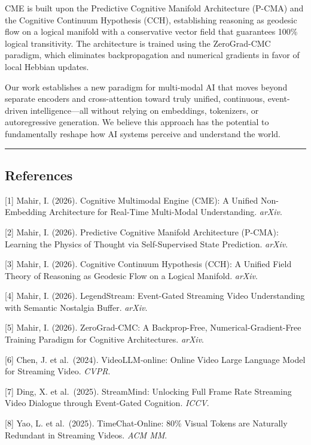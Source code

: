 \documentclass[
  11pt,
  a4paper,
]{article}
\begin{document}
CME is built upon the Predictive Cognitive Manifold Architecture (P-CMA)
and the Cognitive Continuum Hypothesis (CCH), establishing reasoning as
geodesic flow on a logical manifold with a conservative vector field
that guarantees 100\% logical transitivity. The architecture is trained
using the ZeroGrad-CMC paradigm, which eliminates backpropagation and
numerical gradients in favor of local Hebbian updates.

Our work establishes a new paradigm for multi-modal AI that moves beyond
separate encoders and cross-attention toward truly unified, continuous,
event-driven intelligence---all without relying on embeddings,
tokenizers, or autoregressive generation. We believe this approach has
the potential to fundamentally reshape how AI systems perceive and
understand the world.

\begin{center}\rule{0.5\linewidth}{0.5pt}\end{center}

\subsection{References}\label{references}

{[}1{]} Mahir, I. (2026). Cognitive Multimodal Engine (CME): A Unified
Non-Embedding Architecture for Real-Time Multi-Modal Understanding.
\emph{arXiv}.

{[}2{]} Mahir, I. (2026). Predictive Cognitive Manifold Architecture
(P-CMA): Learning the Physics of Thought via Self-Supervised State
Prediction. \emph{arXiv}.

{[}3{]} Mahir, I. (2026). Cognitive Continuum Hypothesis (CCH): A
Unified Field Theory of Reasoning as Geodesic Flow on a Logical
Manifold. \emph{arXiv}.

{[}4{]} Mahir, I. (2026). LegendStream: Event-Gated Streaming Video
Understanding with Semantic Nostalgia Buffer. \emph{arXiv}.

{[}5{]} Mahir, I. (2026). ZeroGrad-CMC: A Backprop-Free,
Numerical-Gradient-Free Training Paradigm for Cognitive Architectures.
\emph{arXiv}.

{[}6{]} Chen, J. et al.~(2024). VideoLLM-online: Online Video Large
Language Model for Streaming Video. \emph{CVPR}.

{[}7{]} Ding, X. et al.~(2025). StreamMind: Unlocking Full Frame Rate
Streaming Video Dialogue through Event-Gated Cognition. \emph{ICCV}.

{[}8{]} Yao, L. et al.~(2025). TimeChat-Online: 80\% Visual Tokens are
Naturally Redundant in Streaming Videos. \emph{ACM MM}.
\end{document}
